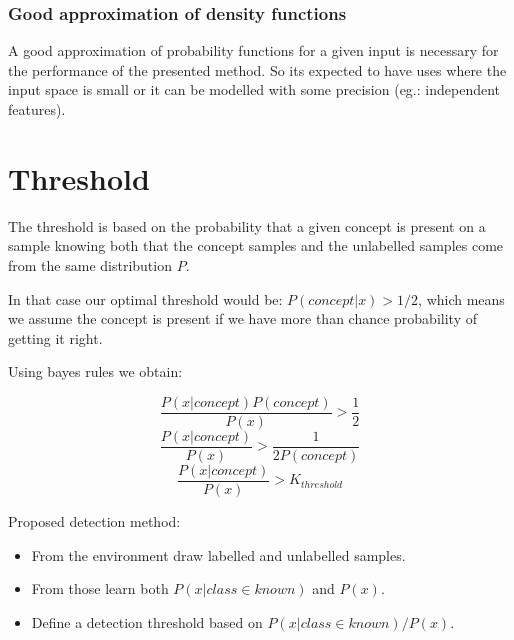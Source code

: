 \documentclass[a4paper]{article}
\begin{document}
\subsubsection*{Good approximation of density functions}
A good approximation of probability functions for a given input is necessary for the performance of the presented method.
So its expected to have uses where the input space is small or it can be modelled with some precision (eg.: independent features).


\section{Threshold}
\label{sec:threshold}

The threshold is based on the probability that a given concept is present on a sample
knowing both that the concept samples and the unlabelled samples come from the same distribution $P$.

In that case our optimal threshold would be:
$P(concept | x) > 1/2$, which means we assume the concept is present if we have more than chance probability of getting it right.

Using bayes rules we obtain:

\begin{equation}\frac{P(x|concept) P(concept)}{P(x)} > \frac{1}{2}\end{equation}
\begin{equation}\frac{P(x|concept)}{P(x)} > \frac{1}{2 P(concept)}\end{equation}
\begin{equation}\frac{P(x|concept)}{P(x)} > K_{threshold}\end{equation}


Proposed detection method:
\begin{itemize}
\item From the environment draw labelled and unlabelled samples.
\item From those learn both $P(x|class \in known)$ and $P(x)$.
\item Define a detection threshold based on $P(x|class \in known)/P(x)$.
\end{itemize}
\end{document}
